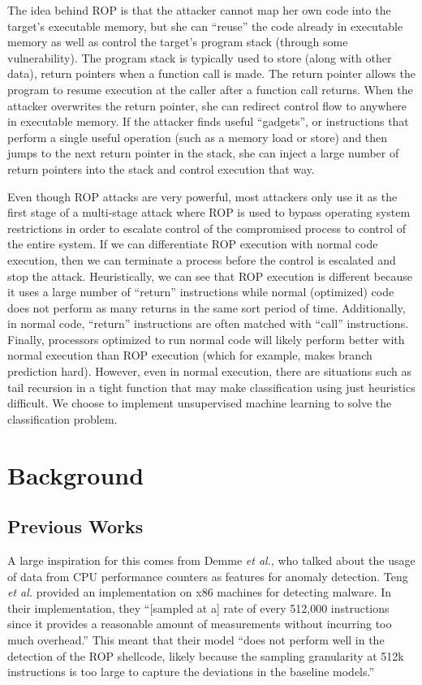\documentclass[letterpaper,twocolumn,10pt]{article}
\begin{document}
The idea behind ROP is that the attacker cannot map her own code into the target's 
executable memory, but she can ``reuse'' the code already in executable memory as 
well as control the target's program stack (through some vulnerability). The 
program stack is typically used to store (along with other data), return pointers 
when a function call is made. The return pointer allows the program to resume 
execution at the caller after a function call returns. When the attacker overwrites 
the return pointer, she can redirect control flow to anywhere in executable 
memory. If the attacker finds useful ``gadgets'', or instructions that perform a 
single useful operation (such as a memory load or store) and then jumps to the 
next return pointer in the stack, she can inject a large number of return 
pointers into the stack and control execution that way.

Even though ROP attacks are very powerful, most attackers only use it 
as the first stage of a multi-stage attack where ROP is used to bypass operating 
system restrictions in order to escalate control of the compromised process to 
control of the entire system. If we can differentiate ROP execution with normal 
code execution, then we can terminate a process before the control is escalated 
and stop the attack. Heuristically, we can see that ROP execution is different 
because it uses a large number of ``return'' instructions while normal (optimized) 
code does not perform as many returns in the same sort period of time. Additionally, 
in normal code, ``return'' 
instructions are often matched with ``call'' instructions. Finally, processors optimized 
to run normal code will likely perform better with normal execution than ROP 
execution (which for example, makes branch prediction hard). However, even in 
normal execution, there are situations such as tail recursion in a tight function 
that may make classification using just heuristics difficult. We choose to 
implement unsupervised machine learning to solve the classification problem.

\section{Background}

\subsection*{Previous Works}

A large inspiration for this comes from Demme \textit{et al.}, 
who talked about the usage of data from CPU performance counters as features for 
anomaly detection\cite{Demme:2013:FOM:2508148.2485970}. Teng \textit{et al.} provided 
an implementation on x86 machines for detecting malware\cite{DBLP:journals/corr/TangSS14}. In their implementation, 
they ``[sampled at a] rate of every 512,000 instructions since it provides a reasonable amount of measurements without incurring too much overhead.'' This meant that their model ``does not perform well in the detection of the ROP shellcode, likely because the sampling granularity at 512k instructions is too large to capture the deviations in the baseline models.''
\end{document}
